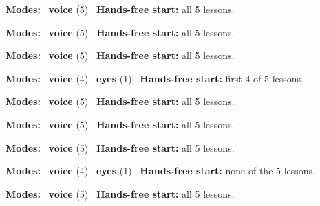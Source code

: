 \expandafter\def\csname hlchaptermodality303\endcsname{%
  {\small\noindent
    \textbf{Modes:} \hlvoicesign{}~\textbf{voice} (5)\quad
    \hlvoicesign{}~\textbf{Hands-free start:} all 5 lessons.%
    \par}\medskip
}

\expandafter\def\csname hlchaptermodality304\endcsname{%
  {\small\noindent
    \textbf{Modes:} \hlvoicesign{}~\textbf{voice} (5)\quad
    \hlvoicesign{}~\textbf{Hands-free start:} all 5 lessons.%
    \par}\medskip
}

\expandafter\def\csname hlchaptermodality305\endcsname{%
  {\small\noindent
    \textbf{Modes:} \hlvoicesign{}~\textbf{voice} (5)\quad
    \hlvoicesign{}~\textbf{Hands-free start:} all 5 lessons.%
    \par}\medskip
}

\expandafter\def\csname hlchaptermodality306\endcsname{%
  {\small\noindent
    \textbf{Modes:} \hlvoicesign{}~\textbf{voice} (4) \quad \hlsightsign{}~\textbf{eyes} (1)\quad
    \hlvoicesign{}~\textbf{Hands-free start:} first 4 of 5 lessons.%
    \par}\medskip
}

\expandafter\def\csname hlchaptermodality307\endcsname{%
  {\small\noindent
    \textbf{Modes:} \hlvoicesign{}~\textbf{voice} (5)\quad
    \hlvoicesign{}~\textbf{Hands-free start:} all 5 lessons.%
    \par}\medskip
}

\expandafter\def\csname hlchaptermodality308\endcsname{%
  {\small\noindent
    \textbf{Modes:} \hlvoicesign{}~\textbf{voice} (5)\quad
    \hlvoicesign{}~\textbf{Hands-free start:} all 5 lessons.%
    \par}\medskip
}

\expandafter\def\csname hlchaptermodality309\endcsname{%
  {\small\noindent
    \textbf{Modes:} \hlvoicesign{}~\textbf{voice} (5)\quad
    \hlvoicesign{}~\textbf{Hands-free start:} all 5 lessons.%
    \par}\medskip
}

\expandafter\def\csname hlchaptermodality310\endcsname{%
  {\small\noindent
    \textbf{Modes:} \hlvoicesign{}~\textbf{voice} (4) \quad \hlsightsign{}~\textbf{eyes} (1)\quad
    \hlvoicesign{}~\textbf{Hands-free start:} none of the 5 lessons.%
    \par}\medskip
}

\expandafter\def\csname hlchaptermodality311\endcsname{%
  {\small\noindent
    \textbf{Modes:} \hlvoicesign{}~\textbf{voice} (5)\quad
    \hlvoicesign{}~\textbf{Hands-free start:} all 5 lessons.%
    \par}\medskip
}

